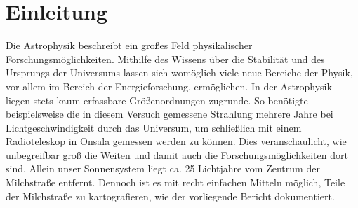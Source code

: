 \section{Einleitung}
Die Astrophysik beschreibt ein großes Feld physikalischer Forschungsmöglichkeiten. Mithilfe des Wissens über die Stabilität und des Ursprungs der Universums lassen sich womöglich viele neue Bereiche der Physik, vor allem im Bereich der Energieforschung, ermöglichen.
In der Astrophysik liegen stets kaum erfassbare Größenordnungen zugrunde.
So benötigte beispielsweise die in diesem Versuch gemessene Strahlung mehrere Jahre bei Lichtgeschwindigkeit durch das Universum, um schließlich mit einem Radioteleskop in Onsala gemessen werden zu können.
Dies veranschaulicht, wie unbegreifbar groß die Weiten und damit auch die Forschungsmöglichkeiten dort sind.
Allein unser Sonnensystem liegt ca. 25 Lichtjahre vom Zentrum der Milchstraße entfernt.
Dennoch ist es mit recht einfachen Mitteln möglich, Teile der Milchstraße zu kartografieren, wie der vorliegende Bericht dokumentiert.
\newline